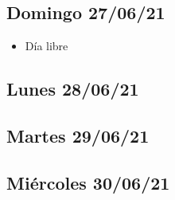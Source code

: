 \subsection*{Domingo 27/06/21}
    \begin{itemize}
        \item Día libre 
    \end{itemize}

\subsection*{Lunes 28/06/21}
\subsection*{Martes 29/06/21}
\subsection*{Miércoles 30/06/21}


\clearpage